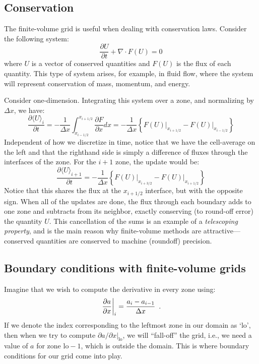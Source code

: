 \subsection{Conservation}

The finite-volume grid is useful when dealing with conservation laws.
Consider the following system:
\begin{equation}
\frac{\partial U}{\partial t} + \nabla \cdot F(U) = 0
\end{equation}
where $U$ is a vector of conserved quantities and $F(U)$ is the flux
of each quantity.  This type of system arises, for example, in fluid
flow, where the system will represent conservation of mass, momentum,
and energy.

Consider one-dimension.  
Integrating this system over a zone, and normalizing by $\Delta x$, we have:
\begin{equation}
\frac{\partial \langle U\rangle_i}{\partial t} = 
  -\frac{1}{\Delta x} \int_{x_{i-1/2}}^{x_{i+1/2}} \frac{\partial F}{\partial x} dx =
  - \frac{1}{\Delta x} \left \{ \left . F(U) \right |_{x_{i+1/2}} -
                                \left . F(U) \right |_{x_{i-1/2}} \right \}
\end{equation}
Independent of how we discretize in time, notice that we have the cell-average
on the left and that the righthand side
is simply a difference of fluxes through the interfaces of the zone.
For the $i+1$ zone, the update would be:
\begin{equation}
\frac{\partial \langle U\rangle_{i+1}}{\partial t} = 
  - \frac{1}{\Delta x} \left \{ \left . F(U) \right |_{x_{i+3/2}} -
                                \left . F(U) \right |_{x_{i+1/2}} \right \}
\end{equation}
Notice that this shares the flux at the $x_{i+1/2}$ interface, but with the 
opposite sign.  When all of the updates are done, the flux through each
boundary adds to one zone and subtracts from its neighbor, exactly conserving
(to round-off error) the quantity $U$.  This cancellation of the sums
is an example of a {\em telescoping property}, and is the main reason
why finite-volume methods are attractive---conserved quantities are 
conserved to machine (roundoff) precision.

\subsection{Boundary conditions with finite-volume grids}

Imagine that we wish to compute the derivative in every zone using:
\begin{equation}
\left . \frac{\partial a}{\partial x} \right |_i = \frac{a_i - a_{i-1}}{\Delta x} \enskip .
\label{eq:onesideddiff}
\end{equation}
If we denote the index corresponding to the leftmost zone in our
domain as `lo', then when we try to compute ${\partial a}/{\partial x}
|_\mathrm{lo}$, we will ``fall-off'' the grid, i.e., we need a value
of $a$ for zone $\mathrm{lo}-1$, which is outside the domain.  This is
where boundary conditions for our grid come into play.  

